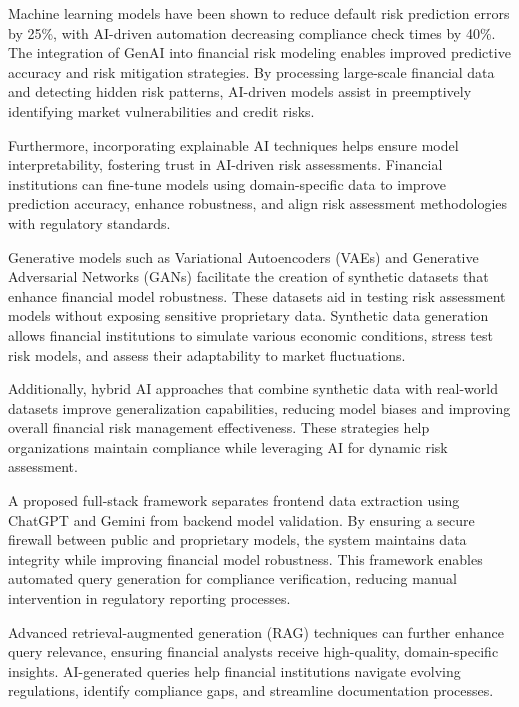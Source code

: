\documentclass[a4paper,headinclude=on,footinclude=on,12pt,oneside]{scrbook}
\begin{document}
	
	Machine learning models have been shown to reduce default risk prediction errors by 25\%, with AI-driven automation decreasing compliance check times by 40\%. The integration of GenAI into financial risk modeling enables improved predictive accuracy and risk mitigation strategies. By processing large-scale financial data and detecting hidden risk patterns, AI-driven models assist in preemptively identifying market vulnerabilities and credit risks.
	
	Furthermore, incorporating explainable AI techniques helps ensure model interpretability, fostering trust in AI-driven risk assessments. Financial institutions can fine-tune models using domain-specific data to improve prediction accuracy, enhance robustness, and align risk assessment methodologies with regulatory standards.
	
	Generative models such as Variational Autoencoders (VAEs) and Generative Adversarial Networks (GANs) facilitate the creation of synthetic datasets that enhance financial model robustness. These datasets aid in testing risk assessment models without exposing sensitive proprietary data. Synthetic data generation allows financial institutions to simulate various economic conditions, stress test risk models, and assess their adaptability to market fluctuations.
	
	Additionally, hybrid AI approaches that combine synthetic data with real-world datasets improve generalization capabilities, reducing model biases and improving overall financial risk management effectiveness. These strategies help organizations maintain compliance while leveraging AI for dynamic risk assessment.
	
	
	A proposed full-stack framework separates frontend data extraction using ChatGPT and Gemini from backend model validation. By ensuring a secure firewall between public and proprietary models, the system maintains data integrity while improving financial model robustness. This framework enables automated query generation for compliance verification, reducing manual intervention in regulatory reporting processes.
	
	Advanced retrieval-augmented generation (RAG) techniques can further enhance query relevance, ensuring financial analysts receive high-quality, domain-specific insights. AI-generated queries help financial institutions navigate evolving regulations, identify compliance gaps, and streamline documentation processes.
	
\end{document}
